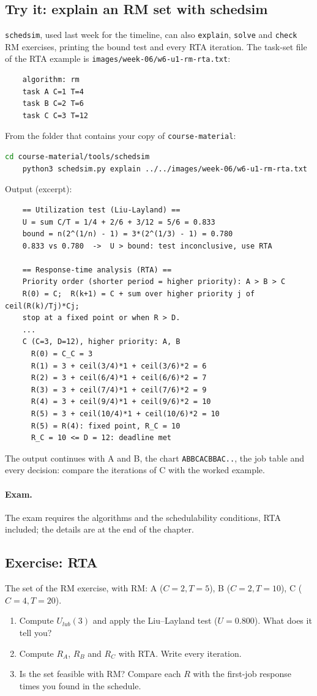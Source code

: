 \subsection{Try it: explain an RM set with schedsim}
\texttt{schedsim}, used last week for the timeline, can also \texttt{explain}, \texttt{solve} and \texttt{check} RM exercises, printing the bound test and every RTA iteration. The task-set file of the RTA example is \texttt{images/week-06/w6-u1-rm-rta.txt}:
\begin{lstlisting}
    algorithm: rm
    task A C=1 T=4
    task B C=2 T=6
    task C C=3 T=12
\end{lstlisting}
From the folder that contains your copy of \texttt{course-material}:
\begin{lstlisting}[language=bash]
    cd course-material/tools/schedsim
    python3 schedsim.py explain ../../images/week-06/w6-u1-rm-rta.txt
\end{lstlisting}
Output (excerpt):
\begin{verbatim}
    == Utilization test (Liu-Layland) ==
    U = sum C/T = 1/4 + 2/6 + 3/12 = 5/6 = 0.833
    bound = n(2^(1/n) - 1) = 3*(2^(1/3) - 1) = 0.780
    0.833 vs 0.780  ->  U > bound: test inconclusive, use RTA

    == Response-time analysis (RTA) ==
    Priority order (shorter period = higher priority): A > B > C
    R(0) = C;  R(k+1) = C + sum over higher priority j of ceil(R(k)/Tj)*Cj;
    stop at a fixed point or when R > D.
    ...
    C (C=3, D=12), higher priority: A, B
      R(0) = C_C = 3
      R(1) = 3 + ceil(3/4)*1 + ceil(3/6)*2 = 6
      R(2) = 3 + ceil(6/4)*1 + ceil(6/6)*2 = 7
      R(3) = 3 + ceil(7/4)*1 + ceil(7/6)*2 = 9
      R(4) = 3 + ceil(9/4)*1 + ceil(9/6)*2 = 10
      R(5) = 3 + ceil(10/4)*1 + ceil(10/6)*2 = 10
      R(5) = R(4): fixed point, R_C = 10
      R_C = 10 <= D = 12: deadline met
\end{verbatim}
The output continues with A and B, the chart \texttt{ABBCACBBAC..}, the job table and every decision: compare the iterations of C with the worked example.

\paragraph{Exam.} The exam requires the algorithms and the schedulability conditions, RTA included; the details are at the end of the chapter.

\subsection{Exercise: RTA}
The set of the RM exercise, with RM: A ($C = 2, T = 5$), B ($C = 2, T = 10$), C ($C = 4, T = 20$).
\begin{enumerate}
    \item Compute $U_{lub}(3)$ and apply the Liu--Layland test ($U = 0.800$). What does it tell you?
    \item Compute $R_A$, $R_B$ and $R_C$ with RTA. Write every iteration.
    \item Is the set feasible with RM? Compare each $R$ with the first-job response times you found in the schedule.
\end{enumerate}

